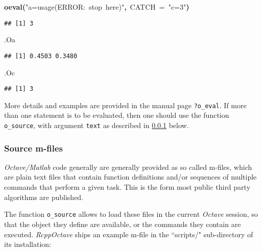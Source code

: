 \documentclass[english,10pt,a4paper]{article}\usepackage{graphicx, color}
\makeatletter
\newcommand{\hlfunctioncall}[1]{\textcolor[rgb]{0.501960784313725,0,0.329411764705882}{\textbf{#1}}}%
\newcommand{\hlstring}[1]{\textcolor[rgb]{0.6,0.6,1}{#1}}%
\newcommand{\hlkeyword}[1]{\textcolor[rgb]{0,0,0}{\textbf{#1}}}%
\newcommand{\hlargument}[1]{\textcolor[rgb]{0.690196078431373,0.250980392156863,0.0196078431372549}{#1}}%
\newcommand{\hlsymbol}[1]{\textcolor[rgb]{0,0,0}{#1}}%
\newcommand{\hlstd}[1]{\textcolor[rgb]{0,0,0}{#1}}%
\newenvironment{kframe}{%
 \def\FrameCommand##1{\hskip\@totalleftmargin \hskip-\fboxsep
 \colorbox{shadecolor}{##1}\hskip-\fboxsep
     \hskip-\linewidth \hskip-\@totalleftmargin \hskip\columnwidth}%
 \MakeFramed {\advance\hsize-\width
   \@totalleftmargin\z@ \linewidth\hsize
   \@setminipage}}%
 {\par\unskip\endMakeFramed}
\newenvironment{knitrout}{}{} %
\let\proglang=\textit
\let\code=\texttt
\newcommand{\pkgname}[1]{\textit{#1}\xspace}
\newcommand{\octave}{\proglang{Octave}\xspace}
\makeatother
\begin{document}
\begin{knitrout}
\begin{kframe}
\begin{flushleft}
\hlstd{}\hlfunctioncall{o\usebox{\hlnormalsizeboxunderscore}eval}\hlkeyword{(}\hlstring{"{}a=usage(\usebox{\hlnormalsizeboxsinglequote}ERROR:{\ }stop{\ }here\usebox{\hlnormalsizeboxsinglequote})"{}}\hlkeyword{,}{\ }\hlargument{CATCH}{\ }\hlargument{=}{\ }\hlstring{"{}c=3"{}}\hlkeyword{)}\mbox{}
\normalfont
\end{flushleft}
\begin{verbatim}
## [1] 3
\end{verbatim}
\begin{flushleft}
\ttfamily\noindent
\hlsymbol{.O}\hlkeyword{\usebox{\hlnormalsizeboxdollar}}\hlsymbol{a}\mbox{}
\normalfont
\end{flushleft}
\begin{verbatim}
## [1] 0.4503 0.3480
\end{verbatim}
\begin{flushleft}
\ttfamily\noindent
\hlsymbol{.O}\hlkeyword{\usebox{\hlnormalsizeboxdollar}}\hlsymbol{c}\mbox{}
\normalfont
\end{flushleft}
\begin{verbatim}
## [1] 3
\end{verbatim}
\end{kframe}
\end{knitrout}


More details and examples are provided in the manual page \code{?o\_eval}.
If more than one statement is to be evaluated, then one should use the function
\code{o\_source}, with argument \code{text} as described in \cref{sec:o_source} below.

\subsubsection{Source m-files}
\label{sec:o_source}

\proglang{Octave/Matlab} code generally are generally provided as so
called m-files, which are plain text files that contain function definitions
and/or sequences of multiple commands that perform a given task.
This is the form most public third party algorithms are published.

The function \code{o\_source} allows to load these files in the current
\octave session, so that the object they define are available, or the
commands they contain are executed.
\pkgname{RcppOctave} ships an example m-file in the ``scripts/" sub-directory
of its installation:
\end{document}
